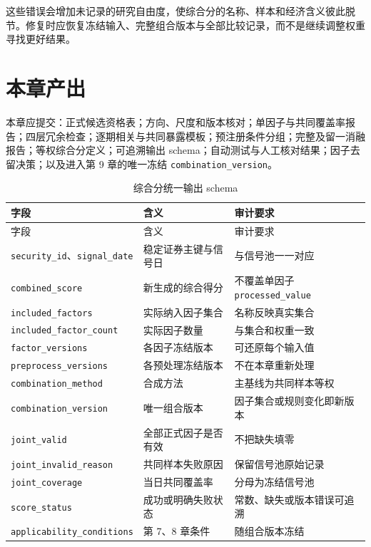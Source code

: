 这些错误会增加未记录的研究自由度，使综合分的名称、样本和经济含义彼此脱节。修复时应恢复冻结输入、完整组合版本与全部比较记录，而不是继续调整权重寻找更好结果。

\section{本章产出}

\begin{outputbox}
本章应提交：正式候选资格表；方向、尺度和版本核对；单因子与共同覆盖率报告；四层冗余检查；逐期相关与共同暴露模板；预注册条件分组；完整及留一消融报告；等权综合分定义；可追溯输出 schema；自动测试与人工核对结果；因子去留决策；以及进入第 9 章的唯一冻结 \texttt{combination\_version}。
\end{outputbox}

\begingroup
\small
\begin{longtable}{@{}p{3.9cm}p{5.0cm}p{5.9cm}@{}}
\caption{综合分统一输出 schema}\label{tab:ch08-score-schema}\\
\toprule
字段 & 含义 & 审计要求 \\
\midrule
\endfirsthead
\toprule
字段 & 含义 & 审计要求 \\
\midrule
\endhead
\texttt{security\_id}、\texttt{signal\_date} & 稳定证券主键与信号日 & 与信号池一一对应 \\
\texttt{combined\_score} & 新生成的综合得分 & 不覆盖单因子 \texttt{processed\_value} \\
\texttt{included\_factors} & 实际纳入因子集合 & 名称反映真实集合 \\
\texttt{included\_factor\_count} & 实际因子数量 & 与集合和权重一致 \\
\texttt{factor\_versions} & 各因子冻结版本 & 可还原每个输入值 \\
\texttt{preprocess\_versions} & 各预处理冻结版本 & 不在本章重新处理 \\
\texttt{combination\_method} & 合成方法 & 主基线为共同样本等权 \\
\texttt{combination\_version} & 唯一组合版本 & 因子集合或规则变化即新版本 \\
\texttt{joint\_valid} & 全部正式因子是否有效 & 不把缺失填零 \\
\texttt{joint\_invalid\_reason} & 共同样本失败原因 & 保留信号池原始记录 \\
\texttt{joint\_coverage} & 当日共同覆盖率 & 分母为冻结信号池 \\
\texttt{score\_status} & 成功或明确失败状态 & 常数、缺失或版本错误可追溯 \\
\texttt{applicability\_conditions} & 第 7、8 章条件 & 随组合版本冻结 \\
\bottomrule
\end{longtable}
\endgroup

